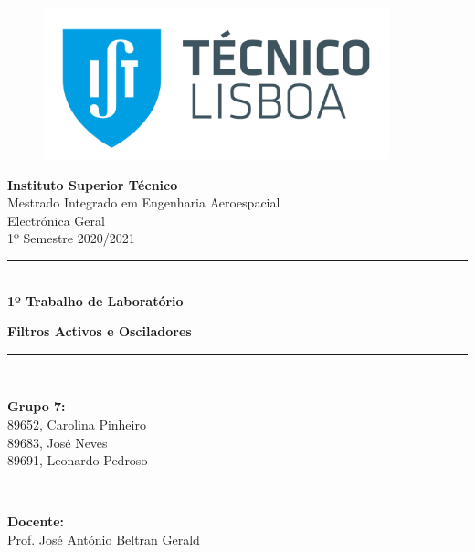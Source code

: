 \documentclass[a4paper, oneside]{article}
\begin{document}
\begin{titlepage}
	\begin{center}
		\begin{figure}[htb!]
			\begin{center}
				\includegraphics[width=10cm]{Imagens/istlogo.jpg}
			\end{center}
		\end{figure}
        
        \begin{center}
        \LARGE{\textbf{\center Instituto Superior Técnico}}\\
        \vspace{20pt}
        \Large{\center Mestrado Integrado em Engenharia Aeroespacial}\\
        \Large{\center Electrónica Geral}\\
        \Large{\center 1º Semestre 2020/2021}\\
        \end{center}
            
        \vspace{60pt}
        \noindent\rule{15cm}{1pt}\\
         \Huge{\center \textbf{1º Trabalho de Laboratório}} \par \Huge{\center \textbf{Filtros Activos e Osciladores
}}\\
         
         \noindent\rule{15cm}{1pt}\\
        
        \vspace{60pt}
        
        
        \begin{minipage}{0.5\textwidth}
		\begin{flushleft} \large
			\textbf{Grupo 7:}\\
			89652, Carolina Pinheiro\\
			89683, José Neves \\
			89691, Leonardo Pedroso\\
		\end{flushleft}
	\end{minipage}
	~
	\begin{minipage}[b]{0.4\textwidth}
		\begin{flushright} \large
        	\textbf{Docente:} \\
            Prof. José António Beltran Gerald \\
		\end{flushright}
	\end{minipage}\\[2cm]
        

\end{center}
\end{titlepage}
\end{document}
